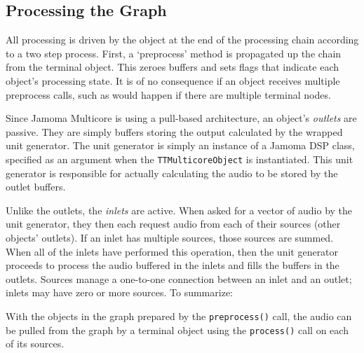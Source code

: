 \documentclass[twoside,a4paper]{article}
\begin{document}


\subsection{Processing the Graph} %

All processing is driven by the object at the end of the processing chain according to a two step process.  
First, a `preprocess' method is propagated up the chain from the terminal object.  
This zeroes buffers and sets flags that indicate each object's processing state.  
It is of no consequence if an object receives multiple preprocess calls, such as would happen if there are multiple terminal nodes.

Since Jamoma Multicore is using a pull-based architecture, an object's \emph{outlets} are passive.  
They are simply buffers storing the output calculated by the wrapped unit generator.  
The unit generator is simply an instance of a Jamoma DSP class, specified as an argument when the \texttt{TTMulticoreObject} is instantiated. 
This unit generator is responsible for actually calculating the audio to be stored by the outlet buffers.

Unlike the outlets, the \emph{inlets} are active.  
When asked for a vector of audio by the unit generator, they then each request audio from each of their sources (other objects' outlets).  
If an inlet has multiple sources, those sources are summed.  
When all of the inlets have performed this operation, then the unit generator proceeds to process the audio buffered in the inlets and fills the buffers in the outlets.  
Sources manage a one-to-one connection between an inlet and an outlet; inlets may have zero or more sources.  
To summarize:

With the objects in the graph prepared by the \texttt{preprocess()} call, the audio can be pulled from the graph by a terminal object using the \texttt{process()} call on each of its sources.


\end{document}
